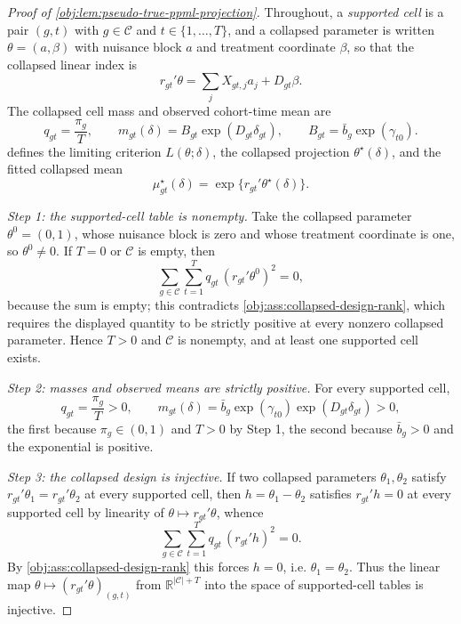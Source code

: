 \documentclass[11pt]{article}
\begin{document}
\begin{proof}[Proof of \cref{obj:lem:pseudo-true-ppml-projection}]
Throughout, a \textit{supported cell} is a pair \((g,t)\) with \(g\in\mathcal C\) and \(t\in\{1,\ldots,T\}\), and a collapsed parameter is written \(\theta=(a,\beta)\) with nuisance block \(a\) and treatment coordinate \(\beta\), so that the collapsed linear index is
\[
r_{gt}'\theta
=
\sum_j X_{gt,j}a_j+D_{gt}\beta .
\]
The collapsed cell mass and observed cohort-time mean are
\[
q_{gt}=\frac{\pi_g}{T},
\qquad
m_{gt}(\delta)=B_{gt}\exp(D_{gt}\delta_{gt}),
\qquad
B_{gt}=\bar b_g\exp(\gamma_{t0}).
\]
 defines the limiting criterion \(L(\theta;\delta)\), the collapsed projection \(\theta^\star(\delta)\), and the fitted collapsed mean
\[
\mu^\star_{gt}(\delta)=\exp\{r_{gt}'\theta^\star(\delta)\}.
\]

\textit{Step 1: the supported-cell table is nonempty.} Take the collapsed parameter \(\theta^{0}=(0,1)\), whose nuisance block is zero and whose treatment coordinate is one, so \(\theta^{0}\neq0\). If \(T=0\) or \(\mathcal C\) is empty, then
\[
\sum_{g\in\mathcal C}\sum_{t=1}^T q_{gt}\,(r_{gt}'\theta^{0})^2=0,
\]
because the sum is empty; this contradicts \cref{obj:ass:collapsed-design-rank}, which requires the displayed quantity to be strictly positive at every nonzero collapsed parameter. Hence \(T>0\) and \(\mathcal C\) is nonempty, and at least one supported cell exists.

\textit{Step 2: masses and observed means are strictly positive.} For every supported cell,
\[
q_{gt}=\frac{\pi_g}{T}>0,
\qquad
m_{gt}(\delta)=\bar b_g\exp(\gamma_{t0})\exp(D_{gt}\delta_{gt})>0,
\]
the first because \(\pi_g\in(0,1)\) and \(T>0\) by Step 1, the second because \(\bar b_g>0\) and the exponential is positive.

\textit{Step 3: the collapsed design is injective.} If two collapsed parameters \(\theta_1,\theta_2\) satisfy \(r_{gt}'\theta_1=r_{gt}'\theta_2\) at every supported cell, then \(h=\theta_1-\theta_2\) satisfies \(r_{gt}'h=0\) at every supported cell by linearity of \(\theta\mapsto r_{gt}'\theta\), whence
\[
\sum_{g\in\mathcal C}\sum_{t=1}^T q_{gt}\,(r_{gt}'h)^2=0 .
\]
By \cref{obj:ass:collapsed-design-rank} this forces \(h=0\), i.e. \(\theta_1=\theta_2\). Thus the linear map \(\theta\mapsto(r_{gt}'\theta)_{(g,t)}\) from \(\mathbb R^{|\mathcal C|+T}\) into the space of supported-cell tables is injective.


\end{proof}
\end{document}
